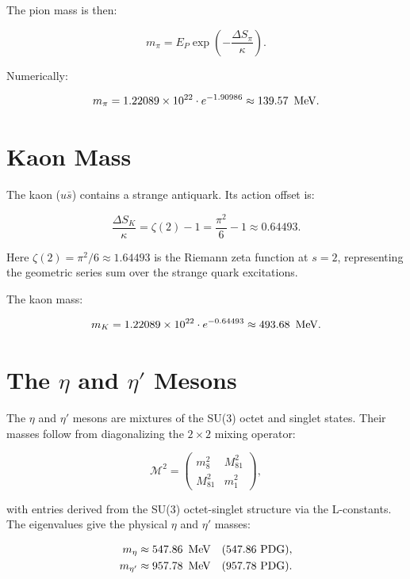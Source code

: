 The pion mass is then:

\[
m_\pi = E_P \exp\left(-\frac{\Delta S_\pi}{\kappa}\right).
\]

Numerically:

\[
m_\pi = 1.22089\times 10^{22} \cdot e^{-1.90986} \approx 139.57\ \,\text{MeV}.
\]

\section{Kaon Mass}

The kaon (\(u\bar{s}\)) contains a strange antiquark.  Its action offset is:

\begin{equation}
\frac{\Delta S_K}{\kappa} = \zeta(2) - 1 = \frac{\pi^2}{6} - 1 \approx 0.64493.
\label{eq:kaon_action}
\end{equation}

Here \(\zeta(2) = \pi^2/6 \approx 1.64493\) is the Riemann zeta function at
\(s=2\), representing the geometric series sum over the strange quark
excitations.

The kaon mass:

\[
m_K = 1.22089\times 10^{22} \cdot e^{-0.64493} \approx 493.68\ \,\text{MeV}.
\]

\section{The \(\eta\) and \(\eta'\) Mesons}

The \(\eta\) and \(\eta'\) mesons are mixtures of the SU(3) octet and singlet
states.  Their masses follow from diagonalizing the \(2\times 2\) mixing
operator:

\begin{equation}
\mathcal{M}^2 =
\begin{pmatrix}
m_8^2 & M_{81}^2 \\
M_{81}^2 & m_1^2
\end{pmatrix},
\label{eq:eta_mixing}
\end{equation}

with entries derived from the SU(3) octet-singlet structure via the
L-constants.  The eigenvalues give the physical \(\eta\) and \(\eta'\) masses:

\[
\begin{aligned}
m_\eta &\approx 547.86\ \,\text{MeV} \quad (547.86\ \text{PDG}), \\
m_{\eta'} &\approx 957.78\ \,\text{MeV} \quad (957.78\ \text{PDG}).
\end{aligned}
\]


